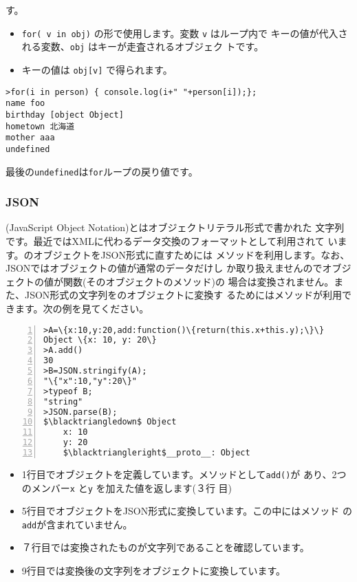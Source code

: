 \begin{itemize}
			 す。
\begin{itemize}
 \item \Verb+for( v in obj)+ の形で使用します。変数 \Verb+v+ はループ内で
       キーの値が代入される変数、\Verb+obj+ はキーが走査されるオブジェク
       トです。
 \item キーの値は \Verb+obj[v]+ で得られます。
\end{itemize}
\begin{Verbatim}[fontsize=\small]
>for(i in person) { console.log(i+" "+person[i]);};
name foo
birthday [object Object]
hometown 北海道
mother aaa
undefined
\end{Verbatim}
最後の\Verb+undefined+は\Verb+for+ループの戻り値です。
\end{itemize}
\subsubsection{JSON}
(JavaScript Object Notation)とはオブジェクトリテラル形式で書かれた
文字列です。最近ではXMLに代わるデータ交換のフォーマットとして利用されて
います。\JS のオブジェクトをJSON形式に直すためには
メソッドを利用します。なお、JSONではオブジェクトの値が通常のデータだけし
か取り扱えませんのでオブジェクトの値が関数(そのオブジェクトのメソッド)の
場合は変換されません。また、JSON形式の文字列を\JS のオブジェクトに変換す
るためにはメソッドが利用できます。次の例を見てください。
\begin{Verbatim}[numbers=left, fontsize=\small,
	commandchars=\\\{\},
	codes={\catcode`$=3\catcode`^=7}]
>A=\{x:10,y:20,add:function()\{return(this.x+this.y);\}\}
Object \{x: 10, y: 20\}
>A.add()
30
>B=JSON.stringify(A);
"\{"x":10,"y":20\}"
>typeof B;
"string"
>JSON.parse(B);
$\blacktriangledown$ Object
	x: 10
	y: 20
	$\blacktriangleright$__proto__: Object
\end{Verbatim}
\begin{itemize}
 \item 1行目でオブジェクトを定義しています。メソッドとして\Verb+add()+が
			 あり、2つのメンバー\Verb+x+ と\Verb+y+ を加えた値を返します(３行
			 目)
 \item 5行目でオブジェクトをJSON形式に変換しています。この中にはメソッド
			 の\Verb+add+が含まれていません。
 \item ７行目では変換されたものが文字列であることを確認しています。
 \item 9行目では変換後の文字列をオブジェクトに変換しています。
\end{itemize}
\fi

